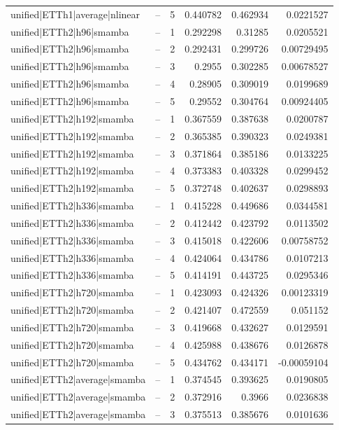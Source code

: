 \begin{longtable}{llrrrr}
unified|ETTh1|average|nlinear & -- & 5 & 0.440782 & 0.462934 & 0.0221527 \\
unified|ETTh2|h96|smamba & -- & 1 & 0.292298 & 0.31285 & 0.0205521 \\
unified|ETTh2|h96|smamba & -- & 2 & 0.292431 & 0.299726 & 0.00729495 \\
unified|ETTh2|h96|smamba & -- & 3 & 0.2955 & 0.302285 & 0.00678527 \\
unified|ETTh2|h96|smamba & -- & 4 & 0.28905 & 0.309019 & 0.0199689 \\
unified|ETTh2|h96|smamba & -- & 5 & 0.29552 & 0.304764 & 0.00924405 \\
unified|ETTh2|h192|smamba & -- & 1 & 0.367559 & 0.387638 & 0.0200787 \\
unified|ETTh2|h192|smamba & -- & 2 & 0.365385 & 0.390323 & 0.0249381 \\
unified|ETTh2|h192|smamba & -- & 3 & 0.371864 & 0.385186 & 0.0133225 \\
unified|ETTh2|h192|smamba & -- & 4 & 0.373383 & 0.403328 & 0.0299452 \\
unified|ETTh2|h192|smamba & -- & 5 & 0.372748 & 0.402637 & 0.0298893 \\
unified|ETTh2|h336|smamba & -- & 1 & 0.415228 & 0.449686 & 0.0344581 \\
unified|ETTh2|h336|smamba & -- & 2 & 0.412442 & 0.423792 & 0.0113502 \\
unified|ETTh2|h336|smamba & -- & 3 & 0.415018 & 0.422606 & 0.00758752 \\
unified|ETTh2|h336|smamba & -- & 4 & 0.424064 & 0.434786 & 0.0107213 \\
unified|ETTh2|h336|smamba & -- & 5 & 0.414191 & 0.443725 & 0.0295346 \\
unified|ETTh2|h720|smamba & -- & 1 & 0.423093 & 0.424326 & 0.00123319 \\
unified|ETTh2|h720|smamba & -- & 2 & 0.421407 & 0.472559 & 0.051152 \\
unified|ETTh2|h720|smamba & -- & 3 & 0.419668 & 0.432627 & 0.0129591 \\
unified|ETTh2|h720|smamba & -- & 4 & 0.425988 & 0.438676 & 0.0126878 \\
unified|ETTh2|h720|smamba & -- & 5 & 0.434762 & 0.434171 & -0.00059104 \\
unified|ETTh2|average|smamba & -- & 1 & 0.374545 & 0.393625 & 0.0190805 \\
unified|ETTh2|average|smamba & -- & 2 & 0.372916 & 0.3966 & 0.0236838 \\
unified|ETTh2|average|smamba & -- & 3 & 0.375513 & 0.385676 & 0.0101636 \\

\end{longtable}
